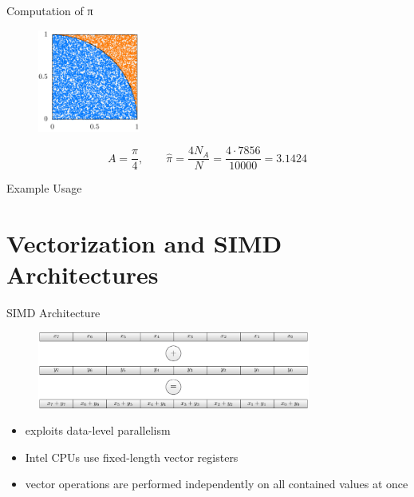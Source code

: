 \documentclass[aspectratio=169]{beamer}
\newcommand{\inputCodeBlock}[1]{%
    \begin{center}
        
    \end{center}
}
\begin{document}
    \begin{frame}{Computation of π}
      \begin{figure}
        \includegraphics[width=0.3\textwidth]{figures/monte_carlo_pi_10000_7856.pdf}
      \end{figure}
      \begin{mybox}
        \[
          A = \frac{π}{4}, \qquad \hat{π} = \frac{4 N_A}{N} = \frac{4 \cdot 7856}{10000} = 3.1424
        \]
      \end{mybox}
    \end{frame}

    \begin{frame}{Example Usage}
      \inputCodeBlock{code/monte_carlo_pi.cpp}
    \end{frame}

  \section{Vectorization and SIMD Architectures} %
    \begin{frame}{SIMD Architecture}
      \begin{figure}
        \includegraphics[width=0.8\textwidth]{figures/simd_vector_operations.pdf}
      \end{figure}
      \begin{itemize}
        \item exploits data-level parallelism
        \item Intel CPUs use fixed-length vector registers
        \item vector operations are performed independently on all contained values at once
      \end{itemize}
    \end{frame}
\end{document}

